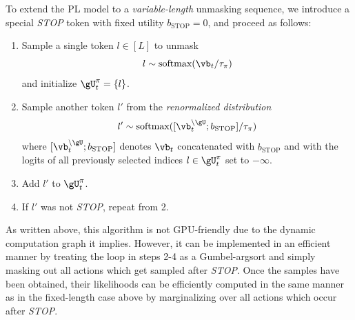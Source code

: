 To extend the PL model to a \emph{variable-length} unmasking sequence, we introduce a special \emph{STOP} token with fixed utility $b_\text{STOP} = 0$, and proceed as follows:
\begin{enumerate}
    \item Sample a single token $l \in [L]$ to unmask $$l \sim \text{softmax}(\vb_t / \tau_{\pi})$$ and initialize $\gU_t^\pi = \{l\}$.
    \item Sample another token $l'$ from the \emph{renormalized distribution} $$l' \sim \text{softmax}([\vb_t^{\backslash \gU} ; b_\text{STOP}] / \tau_{\pi})$$ where $[\vb_t^{\backslash \gU} ; b_\text{STOP}]$ denotes $\vb_t$ concatenated with $b_\text{STOP}$ and with the logits of all previously selected indices $l \in \gU_t^\pi$ set to $-\infty$.
    \item Add $l'$ to $\gU_t^\pi$.
    \item If $l'$ was not \emph{STOP}, repeat from 2.
\end{enumerate}

As written above, this algorithm is not GPU-friendly due to the dynamic computation graph it implies.
However, it can be implemented in an efficient manner by treating the loop in steps 2-4 as a Gumbel-argsort and simply masking out all actions which get sampled after \emph{STOP}.
Once the samples have been obtained, their likelihoods can be efficiently computed in the same manner as in the fixed-length case above by marginalizing over all actions which occur after \emph{STOP}.

